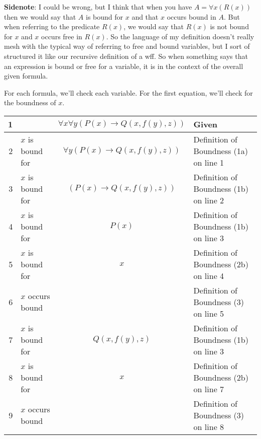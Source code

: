 \documentclass[11pt]{article}
\begin{document}
\begin{framed}
    \textbf{Sidenote}: I could be wrong, but I think that when you have $A = \forall x(R(x))$ then we would say that $A$ is bound for $x$ and that $x$ occurs bound in $A$. But when referring to the predicate $R(x)$, we would say that $R(x)$ is not bound for $x$ and $x$ occurs free in $R(x)$. So the language of my definition doesn't really mesh with the typical way of referring to free and bound variables, but I sort of structured it like our recursive definition of a wff. So when something says that an expression is bound or free for a variable, it is in the context of the overall given formula.
\end{framed}


For each formula, we'll check each variable. For the first equation, we'll check for the boundness of $x$.
\begin{center}
    \begin{tabular}{|r|l c|l|}
    \hline
        1 & & $\forall x \forall y (P(x) \rightarrow Q(x, f(y), z))$ & Given \\
        \hline
        2 & $x$ is bound for & $\forall y (P(x) \rightarrow Q(x, f(y), z))$ & Definition of Boundness (1a) on line 1 \\
        \hline
        3 & $x$ is bound for & $(P(x) \rightarrow Q(x, f(y), z))$ & Definition of Boundness (1b) on line 2 \\
        \hline
        4 & $x$ is bound for & $P(x)$ & Definition of Boundness (1b) on line 3 \\
        \hline
        5 & $x$ is bound for & $x$ & Definition of Boundness (2b) on line 4 \\
        \hline
        6 & $x$ occurs bound & & Definition of Boundness (3) on line 5 \\
        \hline
        7 & $x$ is bound for & $Q(x, f(y), z)$ & Definition of Boundness (1b) on line 3 \\
        \hline
        8 & $x$ is bound for & $x$ & Definition of Boundness (2b) on line 7 \\
        \hline
        9 & $x$ occurs bound & & Definition of Boundness (3) on line 8 \\
        \hline
    \end{tabular}
\end{center}
\end{document}
